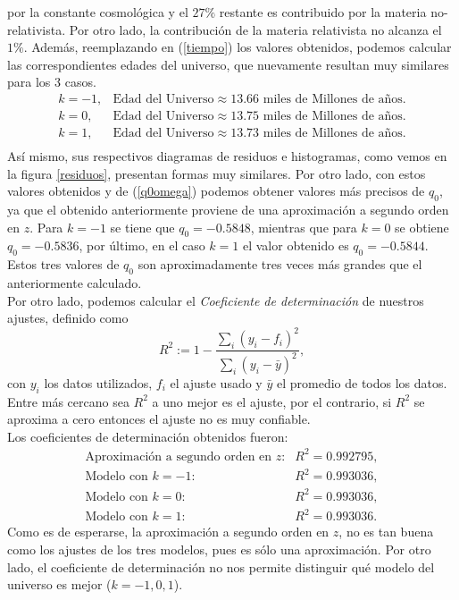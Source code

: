 por la constante cosmológica y el $27\%$ restante es contribuido por la materia no-relativista. Por otro lado, la contribución
de la materia relativista no alcanza el $1\%$. Además, reemplazando en (\ref{tiempo}) los valores obtenidos, podemos
calcular las correspondientes edades del universo, que nuevamente resultan muy similares para los 3 casos.\\
\begin{equation}
\begin{array}{ll}
k=-1,& \mbox{Edad del Universo} \approx 13.66 \mbox{ miles de Millones de años}.\\
k=0, & \mbox{Edad del Universo} \approx 13.75 \mbox{ miles de Millones de años}.\\
k=1, & \mbox{Edad del Universo} \approx 13.73 \mbox{ miles de Millones de años}.\\
\end{array}
\end{equation}
Así mismo, sus respectivos diagramas de residuos e histogramas, como vemos en la figura \ref{residuos}, presentan formas muy similares.
Por otro lado, con estos valores obtenidos y de (\ref{q0omega}) podemos obtener valores más precisos de $q_0$, ya que el obtenido anteriormente
proviene de una aproximación a segundo orden en $z$. Para $k=-1$ se tiene que $q_0=-0.5848$, mientras que para $k=0$ se obtiene $q_0=-0.5836$, por último,
 en el caso $k=1$ el valor obtenido es $ q_0=-0.5844$. Estos tres valores de $q_0$ son aproximadamente tres veces más grandes que el anteriormente
 calculado.\\
 
 Por otro lado, podemos calcular el \textit{Coeficiente de determinación} de nuestros ajustes, definido como 
\begin{equation}
 R^2:=1- \frac{\sum_i(y_i-f_i)^2}{\sum_i(y_i- \bar{y})^2},
\end{equation}
con $y_i$ los datos utilizados, $f_i$ el ajuste usado y $\bar{y}$ el promedio de todos los datos. Entre más cercano sea $R^2$ a uno
mejor es el ajuste, por el contrario, si $R^2$ se aproxima a cero entonces el ajuste no es muy confiable.\\
Los coeficientes de determinación obtenidos fueron:
\begin{equation}
\begin{array}{rl}
\mbox{Aproximación a segundo orden en $z$:}& R^2 = 0.992795,\\
\mbox{Modelo con $k=-1$:}& R^2 = 0.993036,\\
\mbox{Modelo con $k=0$:} & R^2 = 0.993036, \\
\mbox{Modelo con $k=1$:} & R^2 = 0.993036.
\end{array}
\end{equation}
Como es de esperarse, la aproximación a segundo orden en $z$, no es tan buena como los ajustes de los tres modelos, pues es sólo una 
aproximación. Por otro lado, el coeficiente de determinación no nos permite distinguir qué modelo del universo es mejor ($k=-1,0,1$).\\
 

